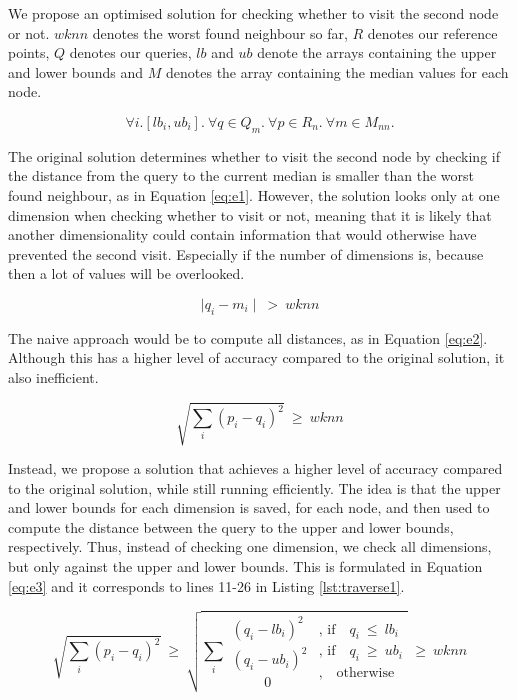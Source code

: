 We propose an optimised solution for checking whether to visit the second node or not. $wknn$ denotes the worst found neighbour so far, $R$ denotes our reference points, $Q$ denotes our queries, $lb$ and $ub$ denote the arrays containing the upper and lower bounds and $M$ denotes the array containing the median values for each node. 

\[
\forall i.[lb_i, ub_i].\ \forall q\in Q_m.\ \forall p\in R_n.\ \forall m\in M_{nn}.
\]

\noindent The original solution determines whether to visit the second node by checking if the distance from the query to the current median is smaller than the worst found neighbour, as in Equation \ref{eq:e1}. However, the solution looks only at one dimension when checking whether to visit or not, meaning that it is likely that another dimensionality could contain information that would otherwise have prevented the second visit. Especially if the number of dimensions is, because then a lot of values will be overlooked. 

\begin{equation}  \label{eq:e1}
\mid q_i - m_i \mid\ >\ wknn
\end{equation} 

\noindent The naive approach would be to compute all distances, as in Equation \ref{eq:e2}. Although this has a higher level of accuracy compared to the original solution, it also inefficient. 

\begin{equation}  \label{eq:e2}
\sqrt{ \sum_{i}^{} (p_i - q_i)^2  }
\ \geq\ wknn
\end{equation}

\noindent Instead, we propose a solution that achieves a higher level of accuracy compared to the original solution, while still running efficiently. The idea is that the upper and lower bounds for each dimension is saved, for each node, and then used to compute the distance between the query to the upper and lower bounds, respectively. Thus, instead of checking one dimension, we check all dimensions, but only against the upper and lower bounds. This is formulated in Equation \ref{eq:e3} and it corresponds to lines 11-26 in Listing \ref{lst:traverse1}. 

\begin{equation}  \label{eq:e3}
\sqrt{ \sum_{i}^{} (p_i - q_i)^2  }\ \geq\
\sqrt{\sum_{i}^{} \substack{(q_i-lb_i)^2 \\ (q_i-ub_i)^2 \\\text{  ~ ~ ~   }0}  \substack{\text{, if  ~ } q_i\ \leq\ lb_i \\ \text{, if  ~ } q_i\ \geq\ ub_i \\\text{, ~ otherwise} }}
\ \geq\ wknn
\end{equation}

